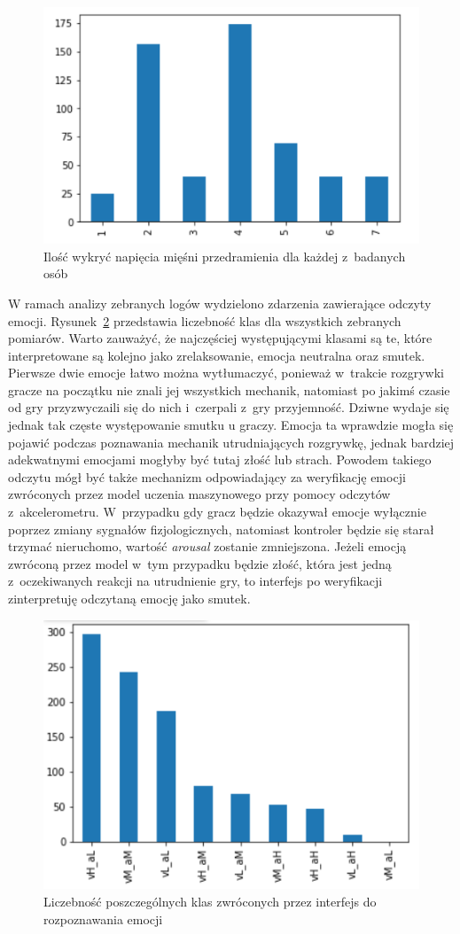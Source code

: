 \begin{figure}
	\centering
	\includegraphics[width=0.6\linewidth]{images/emg_count.png}
	\caption{Ilość wykryć napięcia mięśni przedramienia dla każdej z~badanych osób}
	\label{fig:emg_count}
\end{figure}

W ramach analizy zebranych logów wydzielono zdarzenia zawierające odczyty emocji. Rysunek~\ref{fig:classes_distribution} przedstawia liczebność klas dla wszystkich zebranych pomiarów. Warto zauważyć, że najczęściej występującymi klasami są te, które interpretowane są kolejno jako zrelaksowanie, emocja neutralna oraz smutek. Pierwsze dwie emocje łatwo można wytłumaczyć, ponieważ w~trakcie rozgrywki gracze na początku nie znali jej wszystkich mechanik, natomiast po jakimś czasie od gry przyzwyczaili się do nich i~czerpali z~gry przyjemność. Dziwne wydaje się jednak tak częste występowanie smutku u graczy. Emocja ta wprawdzie mogła się pojawić podczas poznawania mechanik utrudniających rozgrywkę, jednak bardziej adekwatnymi emocjami mogłyby być tutaj złość lub strach. Powodem takiego odczytu mógł być także mechanizm odpowiadający za weryfikację emocji zwróconych przez model uczenia maszynowego przy pomocy odczytów z~akcelerometru. W~przypadku gdy gracz będzie okazywał emocje wyłącznie poprzez zmiany sygnałów fizjologicznych, natomiast kontroler będzie się starał trzymać nieruchomo, wartość \textit{arousal} zostanie zmniejszona. Jeżeli emocją zwróconą przez model w~tym przypadku będzie złość, która jest jedną z~oczekiwanych reakcji na utrudnienie gry, to interfejs po weryfikacji zinterpretuję odczytaną emocję jako smutek.
\begin{figure}[h]
	\centering
	\includegraphics[width=0.6\linewidth]{images/emotions_distribution.png}
	\caption{Liczebność poszczególnych klas zwróconych przez interfejs do rozpoznawania emocji}
	\label{fig:classes_distribution}
\end{figure}

